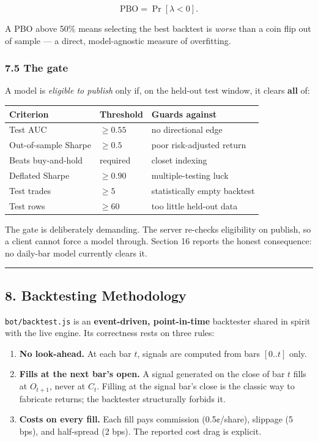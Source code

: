 \documentclass[
  11pt,
]{article}
\newcounter{none} %
\providecommand{\tightlist}{%
  \setlength{\itemsep}{0pt}\setlength{\parskip}{0pt}}
\begin{document}
\[
\text{PBO} = \Pr[\lambda < 0].
\]

A PBO above 50\% means selecting the best backtest is \emph{worse} than
a coin flip out of sample --- a direct, model-agnostic measure of
overfitting.

\subsubsection{7.5 The gate}\label{the-gate}

A model is \emph{eligible to publish} only if, on the held-out test
window, it clears \textbf{all} of:

{\def\LTcaptype{none} %
\begin{longtable}[]{@{}lll@{}}
\toprule\noalign{}
Criterion & Threshold & Guards against \\
\midrule\noalign{}
\endhead
\bottomrule\noalign{}
\endlastfoot
Test AUC & \(\ge 0.55\) & no directional edge \\
Out-of-sample Sharpe & \(\ge 0.5\) & poor risk-adjusted return \\
Beats buy-and-hold & required & closet indexing \\
Deflated Sharpe & \(\ge 0.90\) & multiple-testing luck \\
Test trades & \(\ge 5\) & statistically empty backtest \\
Test rows & \(\ge 60\) & too little held-out data \\
\end{longtable}
}

The gate is deliberately demanding. The server re-checks eligibility on
publish, so a client cannot force a model through. Section 16 reports
the honest consequence: no daily-bar model currently clears it.

\begin{center}\rule{0.5\linewidth}{0.5pt}\end{center}

\subsection{8. Backtesting Methodology}\label{backtesting-methodology}

\texttt{bot/backtest.js} is an \textbf{event-driven, point-in-time}
backtester shared in spirit with the live engine. Its correctness rests
on three rules:

\begin{enumerate}
\def\labelenumi{\arabic{enumi}.}
\tightlist
\item
  \textbf{No look-ahead.} At each bar \(t\), signals are computed from
  bars \([0..t]\) only.
\item
  \textbf{Fills at the next bar's open.} A signal generated on the close
  of bar \(t\) fills at \(O_{t+1}\), never at \(C_t\). Filling at the
  signal bar's close is the classic way to fabricate returns; the
  backtester structurally forbids it.
\item
  \textbf{Costs on every fill.} Each fill pays commission (0.5¢/share),
  slippage (5 bps), and half-spread (2 bps). The reported cost drag is
  explicit.
\end{enumerate}
\end{document}
